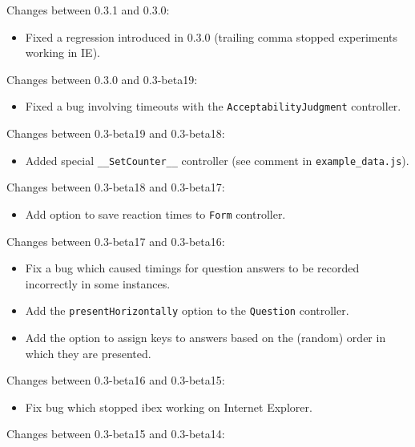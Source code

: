 \documentclass[
]{article}
\providecommand{\tightlist}{%
  \setlength{\itemsep}{0pt}\setlength{\parskip}{0pt}}
\begin{document}
Changes between 0.3.1 and 0.3.0:

\begin{itemize}
\tightlist
\item
  Fixed a regression introduced in 0.3.0 (trailing comma stopped
  experiments working in IE).
\end{itemize}

Changes between 0.3.0 and 0.3-beta19:

\begin{itemize}
\tightlist
\item
  Fixed a bug involving timeouts with the \texttt{AcceptabilityJudgment}
  controller.
\end{itemize}

Changes between 0.3-beta19 and 0.3-beta18:

\begin{itemize}
\tightlist
\item
  Added special \texttt{\_\_SetCounter\_\_} controller (see comment in
  \texttt{example\_data.js}).
\end{itemize}

Changes between 0.3-beta18 and 0.3-beta17:

\begin{itemize}
\tightlist
\item
  Add option to save reaction times to \texttt{Form} controller.
\end{itemize}

Changes between 0.3-beta17 and 0.3-beta16:

\begin{itemize}
\tightlist
\item
  Fix a bug which caused timings for question answers to be recorded
  incorrectly in some instances.
\item
  Add the \texttt{presentHorizontally} option to the \texttt{Question}
  controller.
\item
  Add the option to assign keys to answers based on the (random) order
  in which they are presented.
\end{itemize}

Changes between 0.3-beta16 and 0.3-beta15:

\begin{itemize}
\tightlist
\item
  Fix bug which stopped ibex working on Internet Explorer.
\end{itemize}

Changes between 0.3-beta15 and 0.3-beta14:
\end{document}
